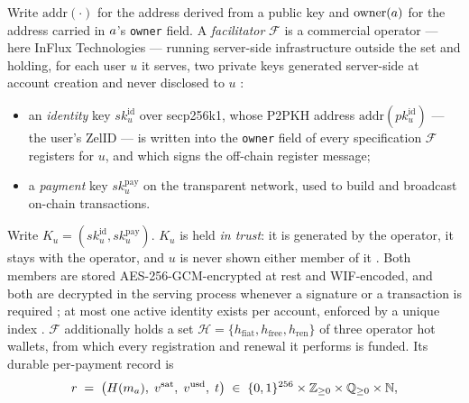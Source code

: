 \begin{definition}
\label{def:facilitator}
Write $\mathrm{addr}(\cdot)$ for the address derived from a public key and $\mathrm{owner}(a)$ for
the address carried in $a$'s \texttt{owner} field. A \emph{facilitator} $\mathcal{F}$ is a
commercial operator --- here InFlux Technologies  ---
running server-side infrastructure outside the \FluxNode set and holding, for each user $u$ it
serves, two private keys generated server-side at account creation and never disclosed to $u$
:
\begin{itemize}\setlength{\itemsep}{1pt}
\item an \emph{identity} key $sk^{\mathrm{id}}_u$ over secp256k1, whose P2PKH address
$\mathrm{addr}(pk^{\mathrm{id}}_u)$ --- the user's ZelID --- is written into the \texttt{owner} field
of every specification $\mathcal{F}$ registers for $u$, and which signs the off-chain register
message;
\item a \emph{payment} key $sk^{\mathrm{pay}}_u$ on the \Flux transparent network, used to build and
broadcast on-chain transactions.
\end{itemize}
Write $K_u = (sk^{\mathrm{id}}_u, sk^{\mathrm{pay}}_u)$. $K_u$ is held \emph{in trust}: it is
generated by the operator, it stays with the operator, and $u$ is never shown either member of it
. Both members are stored
AES-256-GCM-encrypted at rest and WIF-encoded, and both are decrypted in the serving process
whenever a signature or a transaction is required
; at most one active identity exists per
account, enforced by a unique index .
$\mathcal{F}$ additionally holds a set $\mathcal{H} = \{h_{\mathrm{fiat}}, h_{\mathrm{free}},
h_{\mathrm{ren}}\}$ of three operator hot wallets, from which every registration and renewal it
performs is funded. Its durable per-payment record is
\[
r \;=\; \bigl(H(m_{a}),\; v^{\mathrm{sat}},\; v^{\mathrm{usd}},\; t\bigr)
\;\in\; \{0,1\}^{256} \times \mathbb{Z}_{\ge 0} \times \mathbb{Q}_{\ge 0} \times \mathbb{N},
\]
\end{definition}
